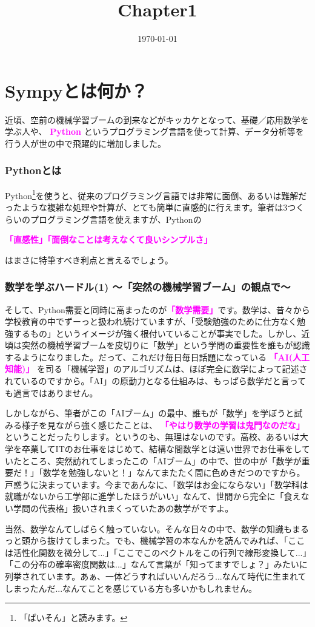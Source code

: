 \documentclass[9pt, a5paper,dvipdfmx]{jsbook}
\title{Chapter1}
\date{\today}
\begin{document}
\tableofcontents
\chapter{Sympyとは何か？}
近頃、空前の機械学習ブームの到来などがキッカケとなって、基礎／応用数学を学ぶ人や、\textcolor{magenta} {
\bf{Python}
}
というプログラミング言語を使って計算、データ分析等を行う人が世の中で飛躍的に増加しました。
\subsection{Pythonとは}
Python\footnote{「ぱいそん」と読みます。}を使うと、従来のプログラミング言語では非常に面倒、あるいは難解だったような複雑な処理や計算が、とても簡単に直感的に行えます。筆者は3つくらいのプログラミング言語を使えますが、Pythonの

\textcolor{magenta}
\bf {「直感性」「面倒なことは考えなくて良いシンプルさ」}

はまさに特筆すべき利点と言えるでしょう。
\subsection{数学を学ぶハードル(1) 〜「突然の機械学習ブーム」の観点で〜}
そして、Python需要と同時に高まったのが\textcolor{magenta}{\bf {「数学需要」}}です。数学は、昔々から学校教育の中でずーっと扱われ続けていますが、「受験勉強のために仕方なく勉強するもの」というイメージが強く根付いていることが事実でした。しかし、近頃は突然の機械学習ブームを皮切りに「数学」という学問の重要性を誰もが認識するようになりました。だって、これだけ毎日毎日話題になっている
\textcolor{magenta}{
\bf{ 「AI(人工知能)」}
}
を司る「機械学習」のアルゴリズムは、ほぼ完全に数学によって記述されているのですから。「AI」の原動力となる仕組みは、もっぱら数学だと言っても過言ではありません。

しかしながら、筆者がこの「AIブーム」の最中、誰もが「数学」を学ぼうと試みる様子を見ながら強く感じたことは、
\textcolor{magenta}{
\bf{「やはり数学の学習は鬼門なのだな」}
}
ということだったりします。というのも、無理はないのです。高校、あるいは大学を卒業してITのお仕事をはじめて、結構な間数学とは遠い世界でお仕事をしていたところ、突然訪れてしまったこの「AIブーム」の中で、世の中が「数学が重要だ！」「数学を勉強しないと！」なんてまたたく間に色めきだつのですから。戸惑うに決まっています。今まであんなに、「数学はお金にならない」「数学科は就職がないから工学部に進学したほうがいい」なんて、世間から完全に「食えない学問の代表格」扱いされまくっていたあの数学がですよ。

当然、数学なんてしばらく触っていない。そんな日々の中で、数学の知識もまるっと頭から抜けてしまった。でも、機械学習の本なんかを読んでみれば、「ここは活性化関数を微分して...」「ここでこのベクトルをこの行列で線形変換して...」「この分布の確率密度関数は...」なんて言葉が「知ってますでしょ？」みたいに列挙されています。あぁ、一体どうすればいいんだろう...なんて時代に生まれてしまったんだ...なんてことを感じている方も多いかもしれません。
\end{document}

